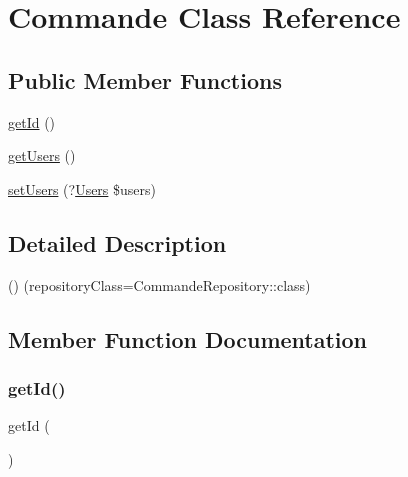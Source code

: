 \hypertarget{class_app_1_1_entity_1_1_commande}{}\section{Commande Class Reference}
\label{class_app_1_1_entity_1_1_commande}
\subsection*{Public Member Functions}
\begin{DoxyCompactItemize}
\item 
\mbox{\hyperlink{class_app_1_1_entity_1_1_commande_a12251d0c022e9e21c137a105ff683f13}{get\+Id}} ()
\item 
\mbox{\hyperlink{class_app_1_1_entity_1_1_commande_a0fc10b64683021b70c7eb95fb514c119}{get\+Users}} ()
\item 
\mbox{\hyperlink{class_app_1_1_entity_1_1_commande_a8128851d16ba70460949bc23dc67c487}{set\+Users}} (?\mbox{\hyperlink{class_app_1_1_entity_1_1_users}{Users}} \$users)
\end{DoxyCompactItemize}


\subsection{Detailed Description}
() (repository\+Class=Commande\+Repository\+::class) 

\subsection{Member Function Documentation}
\mbox{\label{class_app_1_1_entity_1_1_commande_a12251d0c022e9e21c137a105ff683f13}} 
\subsubsection{\texorpdfstring{get\+Id()}{getId()}}
{\footnotesize\ttfamily get\+Id (\begin{DoxyParamCaption}{ }\end{DoxyParamCaption})}

\mbox{\label{class_app_1_1_entity_1_1_commande_a0fc10b64683021b70c7eb95fb514c119}} 

